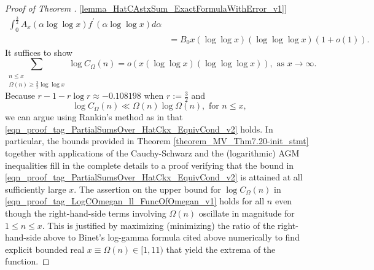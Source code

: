 \documentclass[11pt,reqno,a4letter]{article}
\newcommand{\hlocalref}[1]{\hyperref[#1]{\ref{#1}}}
\numberwithin{equation}{section}
\numberwithin{figure}{section}
\numberwithin{table}{section}
\theoremstyle{plain}
\numberwithin{theorem}{section}
\theoremstyle{definition}
\begin{document}
\begin{proof}[Proof of Theorem \hlocalref{lemma_HatCAstxSum_ExactFormulaWithError_v1}]
\begin{align*}
	\int_0^{\frac{3}{2}} A_x(\alpha \log\log x) f^{\prime}(\alpha \log\log x) d\alpha \\ 
	& = 
	B_0 x (\log\log x)(\log\log\log x) \left(1 + o(1)\right). 
\end{align*}
It suffices to show 
\begin{equation}
\label{eqn_proof_tag_PartialSumsOver_HatCkx_EquivCond_v2}
\sum_{\substack{n \leq x \\ \Omega(n) \geq \frac{3}{2} \log\log x}} 
	\log C_{\Omega}(n)= o\left(x (\log\log x) (\log\log\log x)\right), 
	\text{ as } x \rightarrow \infty. 
\end{equation}
Because $r-1-r\log r \approx -0.108198$ when $r := \frac{3}{2}$ and 
\begin{equation}
\label{eqn_proof_tag_LogCOmegan_ll_FuncOfOmegan_v1}
\log C_{\Omega}(n) \ll \Omega(n) \log \Omega(n), \text{ for } n \leq x,
\end{equation}
we can argue using Rankin's method as in \cite[Thm.~7.20; \S 7.4]{MV} that 
\eqref{eqn_proof_tag_PartialSumsOver_HatCkx_EquivCond_v2} holds. 
In particular, the bounds provided in 
Theorem \hlocalref{theorem_MV_Thm7.20-init_stmt} 
together with applications of the Cauchy-Schwarz and 
the (logarithmic) AGM inequalities fill in the 
complete details to a proof verifying that the bound in 
\eqref{eqn_proof_tag_PartialSumsOver_HatCkx_EquivCond_v2} 
is attained at all sufficiently large $x$. 
The assertion on the upper bound for $\log C_{\Omega}(n)$ in 
\eqref{eqn_proof_tag_LogCOmegan_ll_FuncOfOmegan_v1} holds 
for all $n$ even though the right-hand-side terms involving $\Omega(n)$ 
oscillate in magnitude for $1 \leq n \leq x$. This is justified by 
maximizing (minimizing) the ratio of the right-hand-side above to 
Binet's log-gamma formula cited above 
numerically to find explicit bounded real $x \equiv \Omega(n) \in [1, 11)$ 
that yield the extrema of the function.
\end{proof} 
\end{document}
